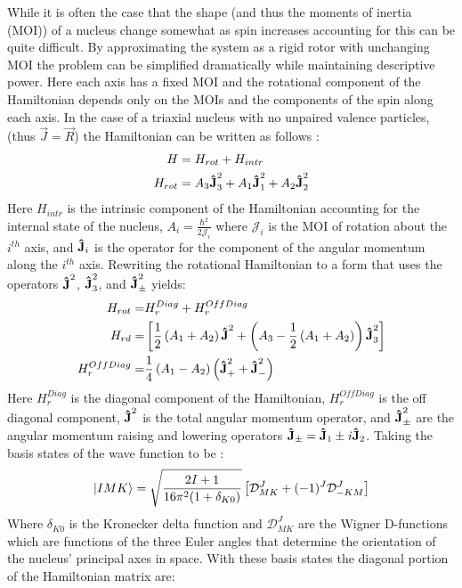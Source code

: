 While it is often the case that the shape (and thus the moments of inertia (MOI)) of a nucleus change somewhat as spin increases accounting for this can be quite difficult. By approximating the system as a rigid rotor with unchanging MOI the problem can be simplified dramatically while maintaining descriptive power. Here each axis has a fixed MOI and the rotational component of the Hamiltonian depends only on the MOIs and the components of the spin along each axis. In the case of a triaxial nucleus with no unpaired valence particles, (thus $\vec{J}=\vec{R}$) the Hamiltonian can be written as follows \cite{triaxRotorSol,wobblingGeometry}:
\begin{align}
\label{eqn:chp2-triaxial-rotor-hamiltonian}
H &= H_{rot} + H_{intr} \\
H_{rot}&=A_3\boldsymbol{\hat{\textbf{J}}}_3^2 + A_1\boldsymbol{\hat{\textbf{J}}}_1^2 + A_2\boldsymbol{\hat{\textbf{J}}}_2^2
\end{align}
Here $H_{intr}$ is the intrinsic component of the Hamiltonian accounting for the internal state of the nucleus, $A_i = \frac{\hbar^2}{2 \mathcal{J}_i}$ where $\mathcal{J}_i$ is the MOI of rotation about the $i^{th}$ axis, and $\boldsymbol{\hat{\textbf{J}}}_i$ is the operator for the component of the angular momentum along the $i^{th}$ axis. Rewriting the rotational Hamiltonian to a form that uses the operators $\boldsymbol{\hat{\textbf{J}}}^2$, $\boldsymbol{\hat{\textbf{J}}}^2_3$, and $\boldsymbol{\hat{\textbf{J}}}^2_{\pm}$ yields:
\begin{align}
\label{eqn:chp2-triaxial-rotor-hamiltonian-rewrite}
H_{rot}=& H_{r}^{Diag} + H_{r}^{OffDiag}\\
H_{rd}=&\left[\frac{1}{2}\left(A_1+A_2\right)\boldsymbol{\hat{\textbf{J}}}^2 + \left(A_3-\frac{1}{2}\left(A_1+A_2\right)\right)\boldsymbol{\hat{\textbf{J}}}^2_3\right]\nonumber\\
H_{r}^{OffDiag}=&\frac{1}{4}\left(A_1-A_2\right)\left(\boldsymbol{\hat{\textbf{J}}}^2_++\boldsymbol{\hat{\textbf{J}}}^2_-\right) \nonumber
\end{align}
Here $H_{r}^{Diag}$ is the diagonal component of the Hamiltonian, $H_{r}^{OffDiag}$ is the off diagonal component, $\boldsymbol{\hat{\textbf{J}}}^2$ is the total angular momentum operator, and $\boldsymbol{\hat{\textbf{J}}}^2_{\pm}$ are the angular momentum raising and lowering operators $\boldsymbol{\hat{\textbf{J}}}_{\pm} = \boldsymbol{\hat{\textbf{J}}}_1\pm\mathit{i}\boldsymbol{\hat{\textbf{J}}}_2$. Taking the basis states of the wave function to be \cite{triaxRotorSol}:
\begin{equation}
\label{eqn:chp2-triaxial-rotor-basis}
\Ket{IMK}= \sqrt{\frac{2I+1}{16\pi^{2}(1+\delta_{K0})}} \left[\mathcal{D}^{J}_{MK} + (-1)^J \mathcal{D}^{J}_{-KM}\right]
\end{equation}
Where $\delta_{K0}$ is the Kronecker delta function and $\mathcal{D}^{J}_{MK}$ are the Wigner D-functions which are functions of the three Euler angles that determine the orientation of the nucleus' principal axes in space. With these basis states the diagonal portion of the Hamiltonian matrix are:
